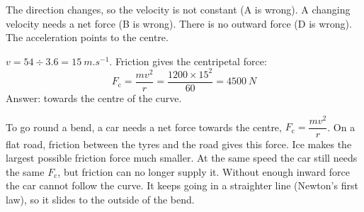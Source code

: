 \begin{practiceanswers}
\begin{practiceans}
  The direction changes, so the velocity is not constant (A is wrong). A
  changing velocity needs a net force (B is wrong). There is no outward force
  (D is wrong). The acceleration points to the centre.
\end{practiceans}

\begin{practiceans}
  $v = 54 \div 3.6 = \qty{15}{m.s^{-1}}$. Friction gives the centripetal force:
  \[ F_\mathrm{c} = \frac{mv^2}{r} = \frac{1200 \times 15^2}{60} = \qty{4500}{N} \]
  Answer:  towards the centre of the curve.
  \begin{markingcriteria}
  \end{markingcriteria}
\end{practiceans}

\begin{practiceans}
  \begin{modelanswer}
  To go round a bend, a car needs a net force towards the centre,
  $F_\mathrm{c} = \dfrac{mv^2}{r}$. On a flat road, friction between the tyres
  and the road gives this force. Ice makes the largest possible friction force
  much smaller. At the same speed the car still needs the same $F_\mathrm{c}$,
  but friction can no longer supply it. Without enough inward force the car
  cannot follow the curve. It keeps going in a straighter line (Newton's first
  law), so it slides to the outside of the bend.
  \end{modelanswer}
  \begin{markingcriteria}
  \end{markingcriteria}
\end{practiceans}
\end{practiceanswers}
